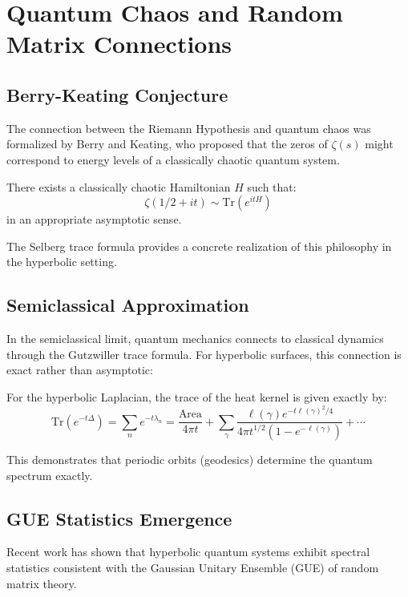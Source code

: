 \section{Quantum Chaos and Random Matrix Connections}
\label{sec:quantum_chaos}

\subsection{Berry-Keating Conjecture}

The connection between the Riemann Hypothesis and quantum chaos was formalized by Berry and Keating, who proposed that the zeros of $\zeta(s)$ might correspond to energy levels of a classically chaotic quantum system.

\begin{conjecture}
\label{conj:berry_keating}
There exists a classically chaotic Hamiltonian $H$ such that:
$$\zeta(1/2 + it) \sim \text{Tr}(e^{itH})$$
in an appropriate asymptotic sense.
\end{conjecture}

The Selberg trace formula provides a concrete realization of this philosophy in the hyperbolic setting.

\subsection{Semiclassical Approximation}

In the semiclassical limit, quantum mechanics connects to classical dynamics through the Gutzwiller trace formula. For hyperbolic surfaces, this connection is exact rather than asymptotic:

\begin{theorem}
\label{thm:gutzwiller_selberg}
For the hyperbolic Laplacian, the trace of the heat kernel is given exactly by:
$$\text{Tr}(e^{-t\Delta}) = \sum_n e^{-t\lambda_n} = \frac{\text{Area}}{4\pi t} + \sum_{\gamma} \frac{\ell(\gamma) e^{-t\ell(\gamma)^2/4}}{4\pi t^{1/2}(1-e^{-\ell(\gamma)})} + \cdots$$
\end{theorem}

This demonstrates that periodic orbits (geodesics) determine the quantum spectrum exactly.

\subsection{GUE Statistics Emergence}

Recent work has shown that hyperbolic quantum systems exhibit spectral statistics consistent with the Gaussian Unitary Ensemble (GUE) of random matrix theory.

